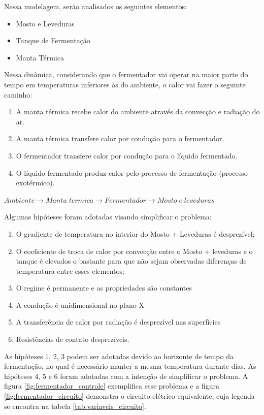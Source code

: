 Nessa modelagem, serão analisados os seguintes elementos: 
\begin{itemize}
    \item Mosto e Leveduras 
    \item Tanque de Fermentação 
    \item Manta Térmica 
\end{itemize}

Nessa dinâmica, considerando que o fermentador vai operar na maior parte do tempo em temperaturas inferiores às do ambiente, o calor vai fazer o seguinte caminho:
\begin{enumerate}
    \item A manta térmica recebe calor do ambiente através da convecção e radiação do ar. 
    \item A manta térmica transfere calor por condução para o fermentador. 
    \item O fermentador transfere calor por condução para o líquido fermentado. 
    \item O líquido fermentado produz calor pelo processo de fermentação (processo exotérmico).
\end{enumerate}

\begin{center}
    \(Ambiente \longrightarrow Manta\;t\acute{e}rmica \longrightarrow Fermentador \longrightarrow Mosto\;e\;leveduras\)
\end{center}



    
Algumas hipóteses foram adotadas visando simplificar o problema: 

\begin{enumerate}
    \item O gradiente de temperatura no interior do Mosto + Leveduras é desprezível; 
    \item O coeficiente de troca de calor por convecção entre o Mosto + leveduras e o tanque é elevados o bastante para que não sejam observadas diferenças de temperatura entre esses elementos; 
    \item O regime é permanente e as propriedades são constantes 
    \item A condução é unidimensional no plano X
    \item A transferência de calor por radiação é desprezível nas superfícies 
    \item Resistências de contato desprezíveis.
\end{enumerate}


As hipóteses 1, 2, 3  podem ser adotadas devido ao horizonte de tempo da fermentação, no qual é necessário manter a mesma temperatura durante dias. As hipóteses 4, 5 e 6 foram adotadas com a intenção de simplificar o problema. A figura \ref{fig:fermentador_controle} exemplifica esse problema e a figura \ref{fig:fermentador_circuito} demonstra o circuito elétrico equivalente, cuja legenda se encontra na tabela \ref{tab:variaveis_circuito}.

